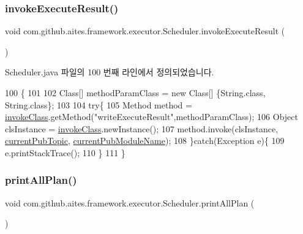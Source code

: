 \subsubsection{\texorpdfstring{invoke\+Execute\+Result()}{invokeExecuteResult()}}
{\footnotesize\ttfamily void com.\+github.\+aites.\+framework.\+executor.\+Scheduler.\+invoke\+Execute\+Result (\begin{DoxyParamCaption}{ }\end{DoxyParamCaption})}



Scheduler.\+java 파일의 100 번째 라인에서 정의되었습니다.


\begin{DoxyCode}
100                                      \{
101         
102         Class[] methodParamClass = \textcolor{keyword}{new} Class[] \{String.class, String.class\};         
103         
104         \textcolor{keywordflow}{try}\{
105             Method method = \mbox{\hyperlink{classcom_1_1github_1_1aites_1_1framework_1_1executor_1_1_scheduler_a4f3e7f2f469b4bdc442fb6c86a1a649b}{invokeClass}}.getMethod(\textcolor{stringliteral}{"writeExecuteResult"},methodParamClass);     
106             Object clsInstance = \mbox{\hyperlink{classcom_1_1github_1_1aites_1_1framework_1_1executor_1_1_scheduler_a4f3e7f2f469b4bdc442fb6c86a1a649b}{invokeClass}}.newInstance();
107             method.invoke(clsInstance, \mbox{\hyperlink{classcom_1_1github_1_1aites_1_1framework_1_1executor_1_1_scheduler_ae69931a45d8afef7275c3ba88bb59271}{currentPubTopic}}, 
      \mbox{\hyperlink{classcom_1_1github_1_1aites_1_1framework_1_1executor_1_1_scheduler_a036d601d648148fb655d33fba188306d}{currentPubModuleName}});
108         \}\textcolor{keywordflow}{catch}(Exception e)\{
109             e.printStackTrace();
110         \}
111     \}
\end{DoxyCode}
\mbox{\label{classcom_1_1github_1_1aites_1_1framework_1_1executor_1_1_scheduler_ad61eade2aa52b3b9eead21d202dc64e1}} 
\subsubsection{\texorpdfstring{print\+All\+Plan()}{printAllPlan()}}
{\footnotesize\ttfamily void com.\+github.\+aites.\+framework.\+executor.\+Scheduler.\+print\+All\+Plan (\begin{DoxyParamCaption}{ }\end{DoxyParamCaption})}



